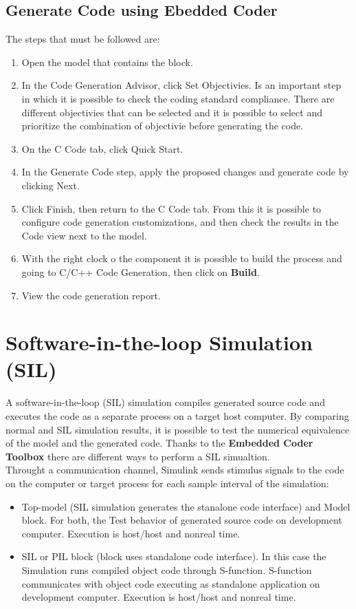\documentclass[12pt,a4paper]{report}
\begin{document}
\subsection{Generate Code using Ebedded Coder}
The steps that must be followed are:
\begin{enumerate}
	\item Open the model that contains the block. 
	\item In the Code Generation Advisor, click Set Objectivies. Is an important step in which it is possible to check the coding standard compliance. There are different objectivies that can be selected and it is possible to select and prioritize the combination of objectivie before generating the code.
	\item On the C Code tab, click Quick Start.
	\item In the Generate Code step, apply the proposed changes and generate code by clicking Next.
	\item Click Finish, then return to the C Code tab. From this it is possible to configure code generation customizations, and then check the results in the Code view next to the model.
	\item With the right clock o the component it is possible to build the process and going to C/C++ Code Generation, then click on \textbf{Build}.
	\item View the code generation report.
\end{enumerate}
\section{Software-in-the-loop Simulation (SIL)}
A software-in-the-loop (SIL) simulation compiles generated source code and executes the code as a separate process on a target host computer. By comparing normal and SIL simulation results, it is possible to test the numerical equivalence of the model and the generated code.
Thanks to the \textbf{Embedded Coder Toolbox} there are different ways to perform a SIL simualtion. \\
Throught a communication channel, Simulink sends stimulus signals to the code on the computer or target process for each sample interval of the simulation:

\begin{itemize}
	\item Top-model (SIL simulation generates the stanalone code interface) and Model block. For both, the Test behavior of generated source code on development computer. Execution is host/host and nonreal time.
	
	\item SIL or PIL block (block uses standalone code interface). In this case the Simulation runs compiled object code through S-function. S-function communicates with object code executing as standalone application on development computer. Execution is host/host and nonreal time.
\end{itemize}
\end{document}
